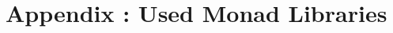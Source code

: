 \documentclass[fontsize=11pt,paper=a4,open=right,twoside,abstract=true]{scrreprt}
\begin{document}


\newpage
\chapter{Appendix : Used Monad Libraries}













\end{document}

